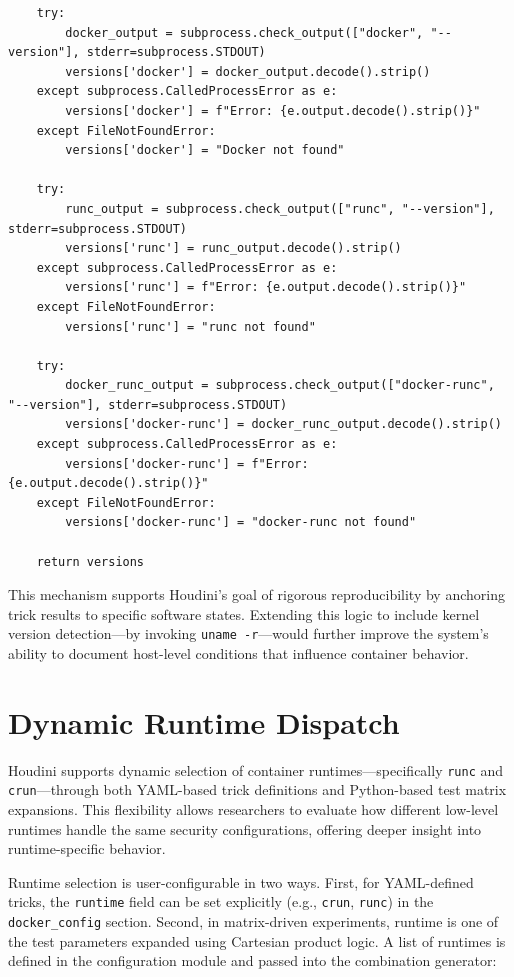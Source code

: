 \documentclass[12pt]{report}
\begin{document}
\begin{doublespace}
\begin{lstlisting}
    try:
        docker_output = subprocess.check_output(["docker", "--version"], stderr=subprocess.STDOUT)
        versions['docker'] = docker_output.decode().strip()
    except subprocess.CalledProcessError as e:
        versions['docker'] = f"Error: {e.output.decode().strip()}"
    except FileNotFoundError:
        versions['docker'] = "Docker not found"

    try:
        runc_output = subprocess.check_output(["runc", "--version"], stderr=subprocess.STDOUT)
        versions['runc'] = runc_output.decode().strip()
    except subprocess.CalledProcessError as e:
        versions['runc'] = f"Error: {e.output.decode().strip()}"
    except FileNotFoundError:
        versions['runc'] = "runc not found"

    try:
        docker_runc_output = subprocess.check_output(["docker-runc", "--version"], stderr=subprocess.STDOUT)
        versions['docker-runc'] = docker_runc_output.decode().strip()
    except subprocess.CalledProcessError as e:
        versions['docker-runc'] = f"Error: {e.output.decode().strip()}"
    except FileNotFoundError:
        versions['docker-runc'] = "docker-runc not found"

    return versions
\end{lstlisting}

This mechanism supports Houdini’s goal of rigorous reproducibility by anchoring trick results to specific software states. Extending this logic to include kernel version detection—by invoking \texttt{uname -r}—would further improve the system’s ability to document host-level conditions that influence container behavior.



\section{Dynamic Runtime Dispatch}

Houdini supports dynamic selection of container runtimes—specifically \texttt{runc} and \texttt{crun}—through both YAML-based trick definitions and Python-based test matrix expansions. This flexibility allows researchers to evaluate how different low-level runtimes handle the same security configurations, offering deeper insight into runtime-specific behavior.

Runtime selection is user-configurable in two ways. First, for YAML-defined tricks, the \texttt{runtime} field can be set explicitly (e.g., \texttt{crun}, \texttt{runc}) in the \texttt{docker\_config} section. Second, in matrix-driven experiments, runtime is one of the test parameters expanded using Cartesian product logic. A list of runtimes is defined in the configuration module and passed into the combination generator:


\end{doublespace}
\end{document}
